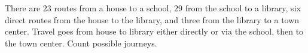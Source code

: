 There are $23$ routes from a house to a school, $29$ from the school to a library, six direct routes from the house to the library, and three from the library to a town center. Travel goes from house to library either directly or via the school, then to the town center. Count possible journeys.
